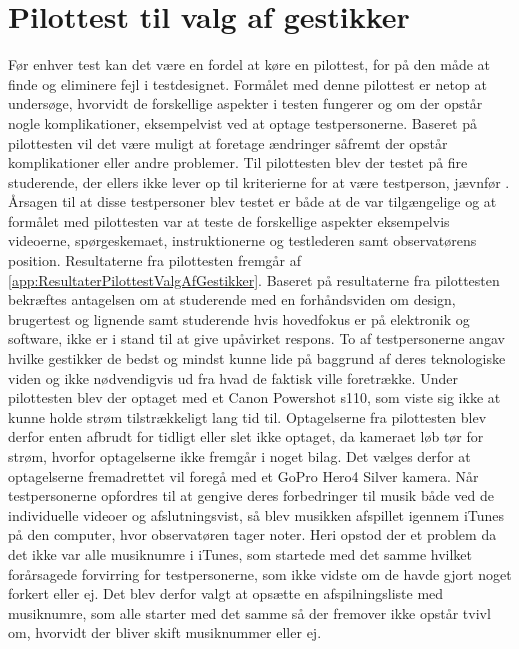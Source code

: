\section{Pilottest til valg af gestikker}
\label{PilottestValgAfGestikker}
%
Før enhver test kan det være en fordel at køre en pilottest, for på den måde at finde og eliminere fejl i testdesignet. Formålet med denne pilottest er netop at undersøge, hvorvidt de forskellige aspekter i testen fungerer og om der opstår nogle komplikationer, eksempelvist ved at optage testpersonerne. Baseret på pilottesten vil det være muligt at foretage ændringer såfremt der opstår komplikationer eller andre problemer.\blankline
%  
Til pilottesten blev der testet på fire studerende, der ellers ikke lever op til kriterierne for at være testperson, jævnfør . Årsagen til at disse testpersoner blev testet er både at de var tilgængelige og at formålet med pilottesten var at teste de forskellige aspekter eksempelvis videoerne, spørgeskemaet, instruktionerne og testlederen samt observatørens position. Resultaterne fra pilottesten fremgår af \autoref{app:ResultaterPilottestValgAfGestikker}. Baseret på resultaterne fra pilottesten bekræftes antagelsen om at studerende med en forhåndsviden om design, brugertest og lignende samt studerende hvis hovedfokus er på elektronik og software, ikke er i stand til at give upåvirket respons. To af testpersonerne angav hvilke gestikker de bedst og mindst kunne lide på baggrund af deres teknologiske viden og ikke nødvendigvis ud fra hvad de faktisk ville foretrække.\blankline
% 
Under pilottesten blev der optaget med et Canon Powershot s110, som viste sig ikke at kunne holde strøm tilstrækkeligt lang tid til. Optagelserne fra pilottesten blev derfor enten afbrudt for tidligt eller slet ikke optaget, da kameraet løb tør for strøm, hvorfor optagelserne ikke fremgår i noget bilag. Det vælges derfor at optagelserne fremadrettet vil foregå med et GoPro Hero4 Silver kamera.\blankline
% 
Når testpersonerne opfordres til at gengive deres forbedringer til musik både ved de individuelle videoer og afslutningsvist, så blev musikken afspillet igennem iTunes på den computer, hvor observatøren tager noter. Heri opstod der et problem da det ikke var alle musiknumre i iTunes, som startede med det samme hvilket forårsagede forvirring for testpersonerne, som ikke vidste om de havde gjort noget forkert eller ej. Det blev derfor valgt at opsætte en afspilningsliste med musiknumre, som alle starter med det samme så der fremover ikke opstår tvivl om, hvorvidt der bliver skift musiknummer eller ej. 


